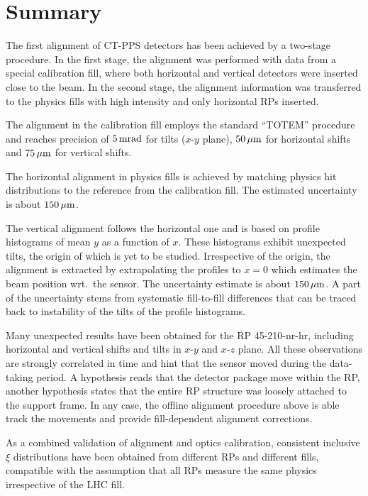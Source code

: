 \documentclass[TOTEM]{cern/cernphprep}
\def\un#1{\,{\rm #1}}
\begin{document}

\section{Summary}
\label{s:sum}

The first alignment of CT-PPS detectors has been achieved by a two-stage procedure. In the first stage, the alignment was performed with data from a special calibration fill, where both horizontal and vertical detectors were inserted close to the beam. In the second stage, the alignment information was transferred to the physics fills with high intensity and only horizontal RPs inserted.

The alignment in the calibration fill employs the standard ``TOTEM'' procedure and reaches precision of $5\un{mrad}$ for tilts ($x$-$y$ plane), $50\un{\mu m}$ for horizontal shifts and $75\un{\mu m}$ for vertical shifts.

The horizontal alignment in physics fills is achieved by matching physics hit distributions to the reference from the calibration fill. The estimated uncertainty is about $150\un{\mu m}$.

The vertical alignment follows the horizontal one and is based on profile histograms of mean $y$ as a function of $x$. These histograms exhibit unexpected tilts, the origin of which is yet to be studied. Irrespective of the origin, the alignment is extracted by extrapolating the profiles to $x=0$ which estimates the beam position wrt.~the sensor. The uncertainty estimate is about $150\un{\mu m}$. A part of the uncertainty stems from systematic fill-to-fill differences that can be traced back to instability of the tilts of the profile histograms.

Many unexpected results have been obtained for the RP 45-210-nr-hr, including horizontal and vertical shifts and tilts in $x$-$y$ and $x$-$z$ plane. All these observations are strongly correlated in time and hint that the sensor moved during the data-taking period. A hypothesis reads that the detector package move within the RP, another hypothesis states that the entire RP structure was loosely attached to the support frame. In any case, the offline alignment procedure above is able track the movements and provide fill-dependent alignment corrections.

As a combined validation of alignment and optics calibration, consistent inclusive $\xi$ distributions have been obtained from different RPs and different fills, compatible with the assumption that all RPs measure the same physics irrespective of the LHC fill.
\end{document}
